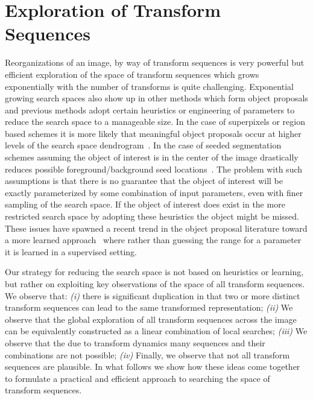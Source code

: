 \section{Exploration of Transform Sequences}
\label{sec:cgraph}

 

 









Reorganizations of an image, by way of transform sequences is very powerful but efficient exploration of the space of transform sequences which grows exponentially with the number of transforms is quite challenging. Exponential growing search spaces also show up in other methods which form object proposals and previous methods adopt certain heuristics or engineering of parameters to reduce the search space to a manageable size. In the case of superpixels or region based schemes it is more likely that meaningful object proposals occur at higher levels of the search space dendrogram~\cite{Bonev:Yuille:ECCV14,Arbelaez:etal:CVPR14}. In the case of seeded segmentation schemes assuming the object of interest is in the center of the image drastically reduces possible foreground/background seed locations~\cite{Carreira:Sminchisescu:PAMI12}. The problem with such assumptions is that there is no guarantee that the object of interest will be exactly parameterized by some combination of input parameters, even with finer sampling of the search space. If the object of interest does exist in the more restricted search space by adopting these heuristics the object might be missed. These issues have spawned a recent trend in the object proposal literature toward a more learned approach~\cite{Krahenbuhl:Koltun:CVPR15} where rather than guessing the range for a parameter it is learned in a supervised setting. 

Our strategy for reducing the search space is not based on heuristics or learning, but rather on exploiting key observations of the space of all transform sequences. We observe that: \emph{(i)} there is significant duplication in that two or more distinct transform sequences can lead to the same transformed representation; \emph{(ii)} We observe that the global exploration of all transform sequences across the image can be equivalently constructed as a linear combination of local searches; \emph{(iii)} We observe that the due to transform dynamics many sequences and their combinations are not possible; \emph{(iv)} Finally, we observe  that not all transform sequences are plausible. In what follows we show how these ideas come together to formulate a practical and efficient approach to searching the space of transform sequences. 


